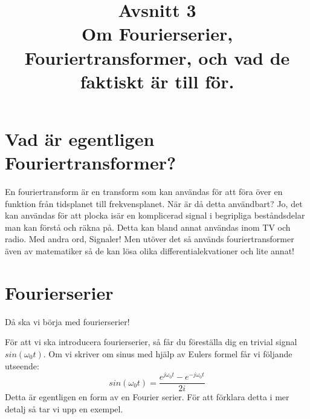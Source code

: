 \documentclass{article}
\title{Avsnitt 3 \\
\large Om Fourierserier, Fouriertransformer, och vad de faktiskt är till för.}
\author{ }
\date{}
\begin{document}
\maketitle

\section{Vad är egentligen Fouriertransformer?}
En fouriertransform är en transform som kan användas för att föra över en funktion från tidsplanet till frekvensplanet. När är då detta användbart? Jo, det kan användas för att plocka isär en komplicerad signal i begripliga beståndsdelar man kan förstå och räkna på. Detta kan bland annat användas inom TV och radio. Med andra ord, Signaler! Men utöver det så används fouriertransformer även av matematiker så de kan lösa olika differentialekvationer och lite annat!



\section{Fourierserier}

Då ska vi börja med fourierserier!

För att vi ska introducera fourierserier, så får du föreställa dig en trivial signal $sin(\omega_0 t)$. Om vi skriver om sinus med hjälp av Eulers formel får vi följande utseende:
$$sin(\omega_0 t) = \frac{e^{j \omega_0 t}  - e^{-j \omega_0 t}}{2i}$$
Detta är egentligen en form av en Fourier serier. För att förklara detta i mer detalj så tar vi upp en exempel.
\end{document}
